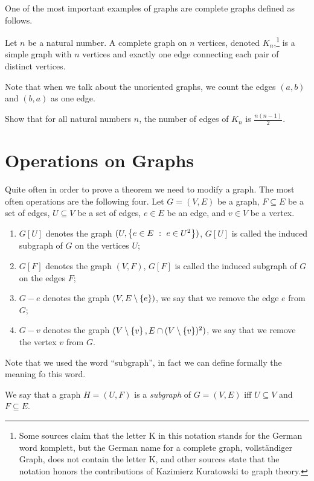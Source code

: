 One of the most important examples of graphs are complete graphs defined as
follows.
\begin{definition}
  Let $n$ be a natural number. A complete graph on $n$ vertices, denoted
  $K_n$,\footnote[][-2cm]{%
    Some sources claim that the letter K in this notation stands for the German
    word komplett, but the German name for a complete graph, vollst\"{a}ndiger
    Graph, does not contain the letter K, and other sources state that the
    notation honors the contributions of Kazimierz Kuratowski to graph theory.
  } is a simple graph with $n$ vertices and exactly one edge connecting
  each pair of distinct vertices.
\end{definition}

Note that when we talk about the unoriented graphs, we count the edges $(a, b)$
and $(b, a)$ as one edge.
\begin{exercise}
  Show that for all natural numbers $n$, the number of edges of $K_n$
  is $\frac{n(n - 1)}{2}$.
\end{exercise}

\section{Operations on Graphs}
Quite often in order to prove a theorem we need to modify a graph. The most
often operations are the following four. Let $G = (V, E)$ be a graph,
$F \subseteq E$ be a set of edges, $U \subseteq V$ be a set of edges,
$e \in E$ be an edge, and $v \in V$ be a vertex.
\begin{enumerate}
  \item $G[U]$ denotes the graph $(U, \set[e \in U^2]{e \in E})$,
    $G[U]$ is called the induced subgraph of $G$ on the vertices $U$;
  \item $G[F]$ denotes the graph $(V, F)$, $G[F]$ is called the induced
    subgraph of $G$ on the edges $F$;
  \item $G - e$ denotes the graph $(V, E \setminus \set{e})$, we say that we
    remove the edge $e$ from $G$;
  \item $G - v$ denotes the graph
    $(V \setminus \set{v}, E \cap (V \setminus \set{v})^2)$, we say that we
    remove the vertex $v$ from $G$.
\end{enumerate}

Note that we used the word ``subgraph'', in fact we can define formally the
meaning fo this word.
\begin{definition}
  We say that a graph $H = (U, F)$ is a \emph{subgraph} of $G = (V, E)$ iff
  $U \subseteq V$ and $F \subseteq E$.
\end{definition}

